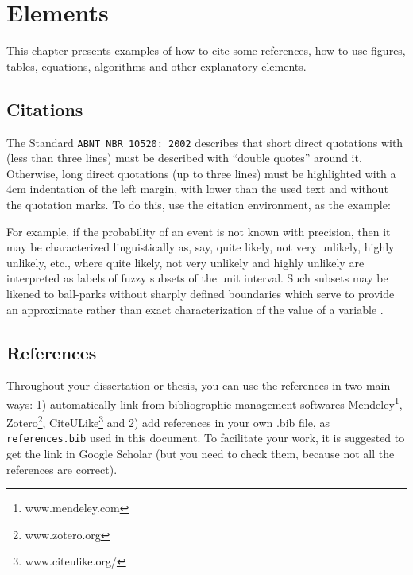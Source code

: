 \chapter[Elements]{Elements} 
\label{chp2_elements} 

This chapter presents examples of how to cite some references, how to use figures, tables, equations, algorithms and other explanatory elements.

\section{Citations}

The Standard \texttt{ABNT NBR 10520: 2002} describes that  short direct quotations with (less than three lines) must be described with ``double quotes'' around it. Otherwise, long direct quotations (up to three lines) must be highlighted with a 4cm indentation of the left margin, with lower than the used text and without the quotation marks. To do this, use the citation environment, as the example:

\begin{citacao}
For example, if the probability of an event is not known with precision, then it may be characterized linguistically as, say, quite likely, not very unlikely, highly unlikely, etc., where quite likely, not very unlikely and highly unlikely are interpreted as labels of fuzzy subsets of the unit interval. Such subsets may be likened to ball-parks without sharply defined boundaries which serve to provide an approximate rather than exact characterization of the value of a variable \citep{zadeh1976fuzzy}.
\end{citacao}

\section{References}

Throughout your dissertation or thesis, you can use the references in two main ways: 1) automatically link from bibliographic management softwares Mendeley\footnote{www.mendeley.com}, Zotero\footnote{www.zotero.org}, CiteULike\footnote{www.citeulike.org/} and 2) add  references in your own .bib file, as \texttt{references.bib} used in this document. To facilitate your work, it is suggested to get the link in Google Scholar (but you need to check them, because not all the references are correct).

